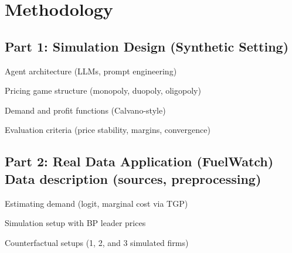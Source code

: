 \section{Methodology}
\subsection{Part 1: Simulation Design (Synthetic Setting)}

Agent architecture (LLMs, prompt engineering)

Pricing game structure (monopoly, duopoly, oligopoly)

Demand and profit functions (Calvano-style)

Evaluation criteria (price stability, margins, convergence)

\subsection{Part 2: Real Data Application (FuelWatch)
Data description (sources, preprocessing)}

Estimating demand (logit, marginal cost via TGP)

Simulation setup with BP leader prices

Counterfactual setups (1, 2, and 3 simulated firms)